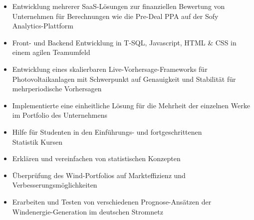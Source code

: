 \documentclass[9pt,a4paper,ragged2e]{altacv}
\begin{document}
    \medskip\medskip\medskip


    \begin{itemize}
        \item Entwicklung mehrerer SaaS-Lösungen zur finanziellen Bewertung von \\ Unternehmen für Berechnungen wie die Pre-Deal PPA auf der Sofy \\ Analytics-Plattform
        \item Front- und Backend Entwicklung in T-SQL, Javascript, HTML \& CSS in einem agilen Teamumfeld
    \end{itemize}

    \divider

    \begin{itemize}
        \item Entwicklung eines skalierbaren Live-Vorhersage-Frameworks für \\ Photovoltaikanlagen mit Schwerpunkt auf Genauigkeit und Stabilität für mehrperiodische Vorhersagen
        \item Implementierte eine einheitliche Lösung für die Mehrheit der einzelnen Werke im Portfolio des Unternehmens
    \end{itemize}

    \divider

    \begin{itemize}
        \item Hilfe für Studenten in den Einführungs- und fortgeschrittenen \\ Statistik Kursen
        \item Erklären und vereinfachen von statistischen Konzepten
    \end{itemize}

    \divider

    \begin{itemize}
        \item Überprüfung des Wind-Portfolios auf Markteffizienz und \\ Verbesserungsmöglichkeiten
        \item Erarbeiten und Testen von verschiedenen Prognose-Ansätzen der Windenergie-Generation im deutschen Stromnetz
    \end{itemize}
\end{document}

